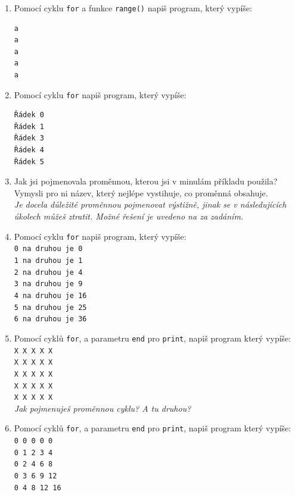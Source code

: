 \documentclass[a4paper,10pt]{article}
\begin{document}
\begin{enumerate}[resume]
\item Pomocí cyklu \verb+for+ a funkce \texttt{range()} napiš program, který vypíše:
\begin{verbatim}
a
a
a
a
a
\end{verbatim}

\item Pomocí cyklu \verb+for+ napiš program, který vypíše:
\begin{verbatim}
Řádek 0
Řádek 1
Řádek 3
Řádek 4
Řádek 5
\end{verbatim}

\item Jak jsi pojmenovala proměnnou, kterou jsi v minulám příkladu použila?
    Vymysli pro ni název, který nejlépe vystihuje, co proměnná obsahuje.
    \\\emph{\small Je docela důležité proměnnou pojmenovat výstižně, jinak se v následujících úkolech můžeš ztratit.
            Možné řešení je uvedeno na za zadáním.}
    \label{cisloradku}

\item Pomocí cyklu \verb+for+ napiš program, který vypíše:
\\\verb+0 na druhou je 0+
\\\verb+1 na druhou je 1+
\\\verb+2 na druhou je 4+
\\\verb+3 na druhou je 9+
\\\verb+4 na druhou je 16+
\\\verb+5 na druhou je 25+
\\\verb+6 na druhou je 36+

\item Pomocí cyklů \verb+for+, a parametru \verb+end+ pro \verb+print+, napiš program který vypíše:
\\\verb+X X X X X+
\\\verb+X X X X X+
\\\verb+X X X X X+
\\\verb+X X X X X+
\\\verb+X X X X X+
    \\\emph{\small Jak pojmenuješ proměnnou cyklu? A tu druhou?}

\item Pomocí cyklů \verb+for+, a parametru \verb+end+ pro \verb+print+, napiš program který vypíše:
\\\verb+0 0 0 0 0+
\\\verb+0 1 2 3 4+
\\\verb+0 2 4 6 8+
\\\verb+0 3 6 9 12+
\\\verb+0 4 8 12 16+


\end{enumerate}
\end{document}
